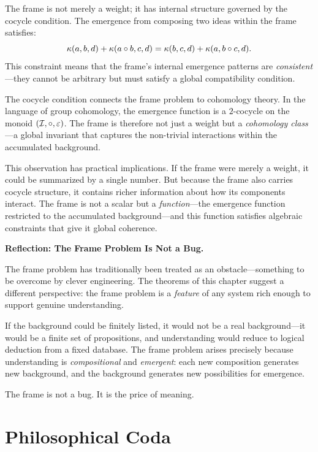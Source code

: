 The frame is not merely a weight; it has internal structure governed by
the cocycle condition.  The emergence from composing two ideas within
the frame satisfies:
\[
\kappa(a, b, d) + \kappa(a \circ b, c, d) =
\kappa(b, c, d) + \kappa(a, b \circ c, d).
\]
This constraint means that the frame's internal emergence patterns are
\emph{consistent}---they cannot be arbitrary but must satisfy a
global compatibility condition.

The cocycle condition connects the frame problem to cohomology theory.
In the language of group cohomology, the emergence function is a
$2$-cocycle on the monoid $(\mathcal{I}, \circ, \varepsilon)$.  The frame is
therefore not just a weight but a \emph{cohomology class}---a global
invariant that captures the non-trivial interactions within the
accumulated background.

This observation has practical implications.  If the frame were
merely a weight, it could be summarized by a single number.  But
because the frame also carries cocycle structure, it contains richer
information about how its components interact.  The frame is not
a scalar but a \emph{function}---the emergence function restricted
to the accumulated background---and this function satisfies
algebraic constraints that give it global coherence.

\begin{reflectionbox}
\noindent\textbf{Reflection: The Frame Problem Is Not a Bug.}

The frame problem has traditionally been treated as an obstacle---something
to be overcome by clever engineering.  The theorems of this chapter suggest
a different perspective: the frame problem is a \emph{feature} of any
system rich enough to support genuine understanding.

If the background could be finitely listed, it would not be a real
background---it would be a finite set of propositions, and understanding
would reduce to logical deduction from a fixed database.  The frame
problem arises precisely because understanding is \emph{compositional}
and \emph{emergent}: each new composition generates new background, and
the background generates new possibilities for emergence.

The frame is not a bug.  It is the price of meaning.
\end{reflectionbox}

\section{Philosophical Coda}

